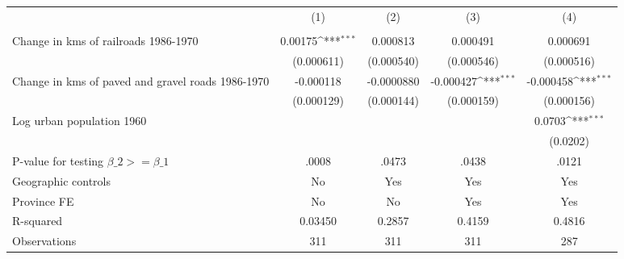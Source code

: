 {
\def\sym#1{\ifmmode^{#1}\else\(^{#1}\)\fi}
\begin{tabular}{l*{4}{c}}
\hline\hline
                &\multicolumn{1}{c}{(1)}&\multicolumn{1}{c}{(2)}&\multicolumn{1}{c}{(3)}&\multicolumn{1}{c}{(4)}\\
                &\multicolumn{1}{c}{}&\multicolumn{1}{c}{}&\multicolumn{1}{c}{}&\multicolumn{1}{c}{}\\
\hline
Change in kms of railroads 1986-1970&  0.00175\sym{***}& 0.000813         & 0.000491         & 0.000691         \\
                &(0.000611)         &(0.000540)         &(0.000546)         &(0.000516)         \\
[1em]
Change in kms of paved and gravel roads 1986-1970&-0.000118         &-0.0000880         &-0.000427\sym{***}&-0.000458\sym{***}\\
                &(0.000129)         &(0.000144)         &(0.000159)         &(0.000156)         \\
[1em]
Log urban population 1960&                  &                  &                  &   0.0703\sym{***}\\
                &                  &                  &                  & (0.0202)         \\
\hline
P-value for testing $\beta\_{2} >= \beta\_{1}$&    .0008         &    .0473         &    .0438         &    .0121         \\
Geographic controls&       No         &      Yes         &      Yes         &      Yes         \\
Province FE     &       No         &       No         &      Yes         &      Yes         \\
R-squared       &  0.03450         &   0.2857         &   0.4159         &   0.4816         \\
Observations    &      311         &      311         &      311         &      287         \\
\hline\hline
\end{tabular}
}
